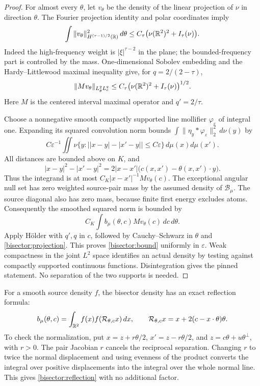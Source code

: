\begin{proof}
For almost every \(\theta\), let \(v_\theta\) be the density of the
linear projection of \(\nu\) in direction \(\theta\). The Fourier
projection identity and polar coordinates imply
\[
 \int\|v_\theta\|_{H^{(\tau-1)/2}(\mathbb R)}^2\,d\theta
 \le C_\tau\bigl(\nu(\mathbb R^2)^2+I_\tau(\nu)\bigr).
\]
Indeed the high-frequency weight is \(|\xi|^{\tau-2}\) in the
plane; the bounded-frequency part is controlled by the mass.
One-dimensional Sobolev embedding and the Hardy--Littlewood maximal
inequality give, for \(q=2/(2-\tau)\),
\begin{equation}\label{bisector:projection}
 \|Mv_\theta\|_{L^2_\theta L^q_c}
 \le C_\tau\bigl(\nu(\mathbb R^2)^2+I_\tau(\nu)\bigr)^{1/2}.
\end{equation}
Here \(M\) is the centered interval maximal operator and
\(q'=2/\tau\).

Choose a nonnegative smooth compactly supported line mollifier
\(\varphi_\varepsilon\) of integral one. Expanding its squared
convolution norm bounds
\(\int\|\eta_y*\varphi_\varepsilon\|_2^2\,d\nu(y)\) by
\[
 C\varepsilon^{-1}\iint
 \nu\{y:\bigl||x-y|-|x'-y|\bigr|\le C\varepsilon\}
 \,d\mu(x)d\mu(x').
\]
All distances are bounded above on \(K\), and
\[
 |x-y|^2-|x'-y|^2
 =2|x-x'|\bigl(c(x,x')-\theta(x,x')\cdot y\bigr).
\]
Thus the integrand is at most
\(C_K|x-x'|^{-1}Mv_\theta(c)\).
The exceptional angular null set has zero weighted source-pair mass
by the assumed density of \(\mathcal B_\mu\). The source diagonal
also has zero mass, because finite first energy excludes atoms.
Consequently the smoothed squared norm is bounded by
\[
 C_K\int b_\mu(\theta,c)Mv_\theta(c)\,dc\,d\theta.
\]
Apply H\"older with \(q',q\) in \(c\), followed by Cauchy--Schwarz
in \(\theta\) and \eqref{bisector:projection}. This proves
\eqref{bisector:bound} uniformly in \(\varepsilon\). Weak compactness
in the joint \(L^2\) space identifies an actual density by testing
against compactly supported continuous functions. Disintegration gives
the pinned statement. No separation of the two supports is needed.
\end{proof}

For a smooth source density \(f\), the bisector density has an exact
reflection formula:
\begin{equation}\label{bisector:reflection}
 b_\mu(\theta,c)=\int_{\mathbb R^2}f(x)f(\mathcal R_{\theta,c}x)\,dx,
 \qquad \mathcal R_{\theta,c}x=x+2(c-x\cdot\theta)\theta.
\end{equation}
To check the normalization, put
\(x=z+r\theta/2\), \(x'=z-r\theta/2\), and
\(z=c\theta+u\theta^\perp\), with \(r>0\). The pair Jacobian
\(r\) cancels the reciprocal separation. Changing \(r\) to twice
the normal displacement and using evenness of the product converts
the integral over positive displacements into the integral over the
whole normal line. This gives \eqref{bisector:reflection} with no
additional factor.

